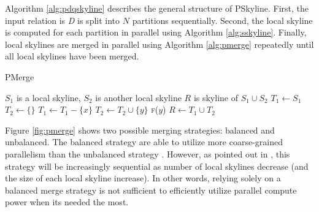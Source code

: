 \documentclass[12pt,a4paper,twoside]{report}
\begin{document}
Algorithm \ref{alg:pdqskyline} describes the general structure of
PSkyline. First, the input relation is \textit{D} is split into
$N$ partitions sequentially. Second, the local skyline is computed
for each partition in parallel using Algorithm \ref{alg:sskyline}.
Finally, local skylines are merged in parallel using Algorithm
\ref{alg:pmerge} repeatedly until all local skylines have been
merged.

\begin{algorithm}[H]
	\caption{PMerge}
	\label{alg:pmerge}
	\begin{algorithmic}[1]
		\Require
			$S_1$ is a local skyline,
			$S_2$ is another local skyline
		\Ensure $R$ is skyline of $S_1 \cup S_2$
		\State $T_1 \leftarrow S_1$
		\State $T_2 \leftarrow \{\}$
					\State $T_1 \leftarrow T_1 - \{x\}$
					\State \Return
				\EndIf
			\EndFor
			\State $T_2 \leftarrow T_2 \cup \{y\}$
		\EndFunction
			\State \textsc{f}($y$)
		\EndForAllP
		\State $R \leftarrow T_1 \cup T_2$
	\end{algorithmic}
\end{algorithm}

Figure \ref{fig:pmerge} shows two possible merging strategies:
balanced and unbalanced. The balanced strategy are able to utilize
more coarse-grained parallelism than the unbalanced strategy
\cite{leiserson1998minicourse}. However, as pointed out in
\cite{park2009parallel}, this strategy will be increasingly sequential
as number of local skylines decrease (and the size of each local
skyline increase). In other words, relying solely on a balanced merge
strategy is not sufficient to efficiently utilize parallel compute
power when its needed the most.
\end{document}
